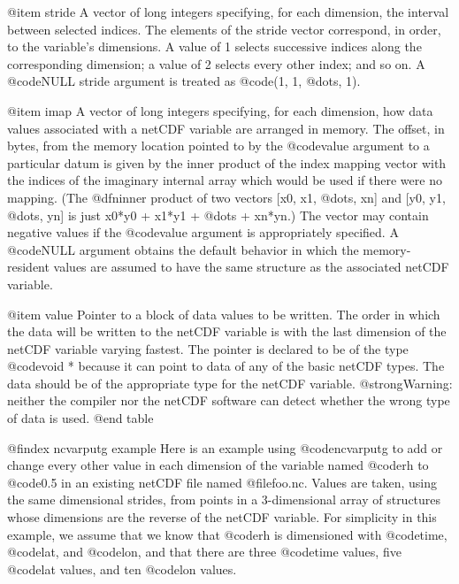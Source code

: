 @item stride
A vector of long integers specifying, for each dimension, the interval
between selected indices.  The elements of the
stride vector correspond, in order, to the variable's dimensions.  A
value of 1 selects successive indices along the
corresponding dimension; a value of 2 selects every other index; and so on.  
A @code{NULL} stride argument is treated as @code{(1, 1, @dots{}, 1)}.

@item imap
A vector of long integers specifying,
for each dimension,
how data values associated with a
netCDF variable are arranged in memory.
The offset, in bytes, from the memory location pointed to by the @code{value}
argument to a particular datum is given by the
inner product of the index mapping vector with the indices of the 
imaginary internal array which would be used if there were no mapping.
(The @dfn{inner product} of two vectors [x0, x1, @dots{}, xn] and
[y0, y1, @dots{}, yn] is just x0*y0 + x1*y1 + @dots{} + xn*yn.)
The vector may contain negative values if the
@code{value} argument is appropriately specified.
A @code{NULL} argument obtains the default behavior in
which the memory-resident values are assumed to have the same structure as the
associated netCDF variable.

@item value
Pointer to a block of data values to be written.  The order in which the
data will be written to the netCDF variable
is with the last
dimension of the netCDF variable varying fastest.
The pointer is declared to be of the type
@code{void *} because it can point to data of any of the basic netCDF
types.  The data should be of the appropriate type for the netCDF
variable.  @strong{Warning: neither the compiler nor the netCDF software
can detect whether the wrong type of data is used.}
@end table

@findex ncvarputg example
Here is an example using @code{ncvarputg} to add or change every other value
in each dimension
of the variable named @code{rh} to @code{0.5} in an existing netCDF file
named @file{foo.nc}.
Values are taken, using the same dimensional strides, from points
in a 3-dimensional array of
structures whose dimensions are the reverse of the netCDF variable.
For simplicity in this example, we assume that we
know that @code{rh} is dimensioned with @code{time}, @code{lat}, and
@code{lon}, and that there are three @code{time} values, five @code{lat}
values, and ten @code{lon} values.

